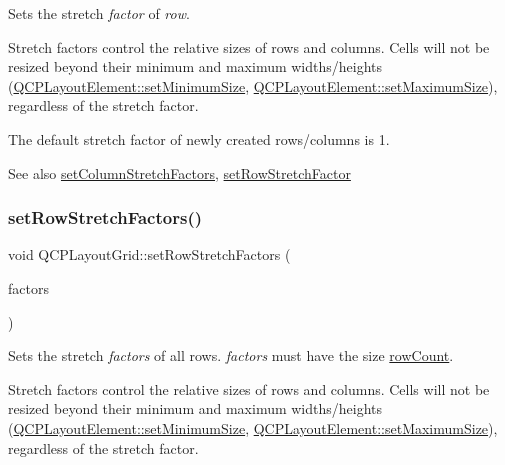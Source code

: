 Sets the stretch {\itshape factor} of {\itshape row}.

Stretch factors control the relative sizes of rows and columns. Cells will not be resized beyond their minimum and maximum widths/heights (\hyperlink{class_q_c_p_layout_element_a5dd29a3c8bc88440c97c06b67be7886b}{Q\+C\+P\+Layout\+Element\+::set\+Minimum\+Size}, \hyperlink{class_q_c_p_layout_element_a74eb5280a737ab44833d506db65efd95}{Q\+C\+P\+Layout\+Element\+::set\+Maximum\+Size}), regardless of the stretch factor.

The default stretch factor of newly created rows/columns is 1.

\begin{DoxySeeAlso}{See also}
\hyperlink{class_q_c_p_layout_grid_a6c2591d1a7e2534ce036989543b49e57}{set\+Column\+Stretch\+Factors}, \hyperlink{class_q_c_p_layout_grid_a7b0273de5369bd93d942edbaf5b166ec}{set\+Row\+Stretch\+Factor} 
\end{DoxySeeAlso}
\hypertarget{class_q_c_p_layout_grid_a200b45f9c908f96ebadaa3c8d87a2782}{}\label{class_q_c_p_layout_grid_a200b45f9c908f96ebadaa3c8d87a2782} 
\subsubsection{\texorpdfstring{set\+Row\+Stretch\+Factors()}{setRowStretchFactors()}}
{\footnotesize\ttfamily void Q\+C\+P\+Layout\+Grid\+::set\+Row\+Stretch\+Factors (\begin{DoxyParamCaption}\item[{const Q\+List$<$ double $>$ \&}]{factors }\end{DoxyParamCaption})}

Sets the stretch {\itshape factors} of all rows. {\itshape factors} must have the size \hyperlink{class_q_c_p_layout_grid_a19c66fd76cbce58a8e94f33797e0c0aa}{row\+Count}.

Stretch factors control the relative sizes of rows and columns. Cells will not be resized beyond their minimum and maximum widths/heights (\hyperlink{class_q_c_p_layout_element_a5dd29a3c8bc88440c97c06b67be7886b}{Q\+C\+P\+Layout\+Element\+::set\+Minimum\+Size}, \hyperlink{class_q_c_p_layout_element_a74eb5280a737ab44833d506db65efd95}{Q\+C\+P\+Layout\+Element\+::set\+Maximum\+Size}), regardless of the stretch factor.

